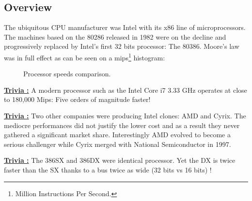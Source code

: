 \documentclass[book.tex]{subfiles}
\begin{document}
  \subsection{Overview}
  The ubiquitous CPU manufacturer was Intel with its x86 line of microprocessors.  The machines based on the 80286 released in 1982 were on the decline and progressively replaced by Intel's first 32 bits processor: The 80386. Moore's law was in full effect as can be seen on a mips\footnote{Million Instructions Per Second.} histogram:




\begin{figure}[H]
\centering
   \caption{Processor speeds comparison.} \label{fig:mips}
 \end{figure}

 \textbf{\underline{Trivia :}} A modern processor such as the Intel Core i7 3.33 GHz operates at close to 180,000 Mips: Five orders of magnitude faster!

 \bigskip

\textbf{\underline{Trivia :}}  Two other companies were producing Intel clones: AMD and Cyrix. The mediocre performances did not justify the lower cost and as a result they never gathered a significant market share. Interestingly AMD evolved to become a serious challenger while Cyrix merged with National Semiconductor in 1997.

 \bigskip
 
 \textbf{\underline{Trivia :}} The 386SX and 386DX were identical processor. Yet the DX is twice faster than the SX thanks to a bus twice as wide (32 bits vs 16 bits) !
\end{document}
